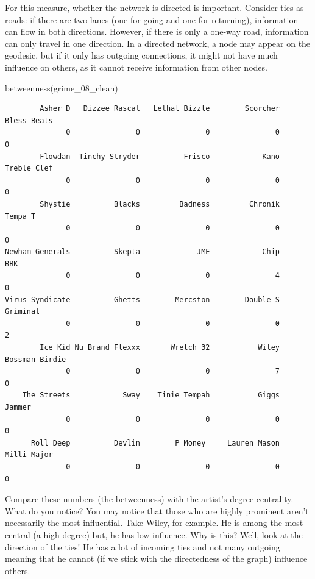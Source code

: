 \documentclass[
  letterpaper,
  DIV=11,
  numbers=noendperiod]{scrreprt}
\newenvironment{Shaded}{\begin{snugshade}}{\end{snugshade}}
\newcommand{\FunctionTok}[1]{\textcolor[rgb]{0.28,0.35,0.67}{#1}}
\newcommand{\NormalTok}[1]{\textcolor[rgb]{0.00,0.23,0.31}{#1}}
\begin{document}
For this measure, whether the network is directed is important. Consider
ties as roads: if there are two lanes (one for going and one for
returning), information can flow in both directions. However, if there
is only a one-way road, information can only travel in one direction. In
a directed network, a node may appear on the geodesic, but if it only
has outgoing connections, it might not have much influence on others, as
it cannot receive information from other nodes.

\begin{Shaded}
\begin{Highlighting}[]
\FunctionTok{betweenness}\NormalTok{(grime\_08\_clean)}
\end{Highlighting}
\end{Shaded}

\begin{verbatim}
        Asher D   Dizzee Rascal   Lethal Bizzle        Scorcher     Bless Beats 
              0               0               0               0               0 
        Flowdan  Tinchy Stryder          Frisco            Kano     Treble Clef 
              0               0               0               0               0 
        Shystie          Blacks         Badness         Chronik         Tempa T 
              0               0               0               0               0 
Newham Generals          Skepta             JME            Chip             BBK 
              0               0               0               4               0 
Virus Syndicate          Ghetts        Mercston        Double S        Griminal 
              0               0               0               0               2 
        Ice Kid Nu Brand Flexxx       Wretch 32           Wiley  Bossman Birdie 
              0               0               0               7               0 
    The Streets            Sway    Tinie Tempah           Giggs          Jammer 
              0               0               0               0               0 
      Roll Deep          Devlin        P Money     Lauren Mason     Milli Major 
              0               0               0               0               0 
\end{verbatim}

Compare these numbers (the betweenness) with the artist's degree
centrality. What do you notice? You may notice that those who are highly
prominent aren't necessarily the most influential. Take Wiley, for
example. He is among the most central (a high degree) but, he has low
influence. Why is this? Well, look at the direction of the ties! He has
a lot of incoming ties and not many outgoing meaning that he cannot (if
we stick with the directedness of the graph) influence others.
\end{document}
